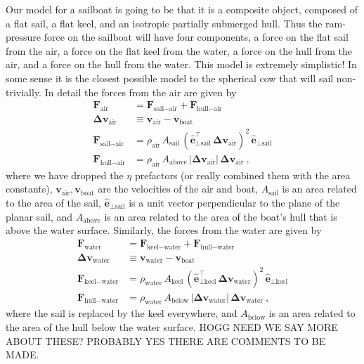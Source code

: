 \documentclass[letterpaper]{article}
\renewcommand{\vec}[1]{\boldsymbol{#1}}
\newcommand{\uvec}{\vec{\hat{e}}}
\newcommand{\air}{\text{air}}
\newcommand{\water}{\text{water}}
\newcommand{\boat}{\text{boat}}
\newcommand{\sail}{\text{sail}}
\newcommand{\keel}{\text{keel}}
\newcommand{\hull}{\text{hull}}
\renewcommand{\above}{\text{above}}
\newcommand{\below}{\text{below}}
\newcommand{\vair}{\vec{v}_\air}
\newcommand{\vwater}{\vec{v}_\water}
\newcommand{\vboat}{\vec{v}_\boat}
\begin{document}
Our model for a sailboat is going to be that it is a composite object, composed of a flat sail, a flat keel, and an isotropic partially submerged hull.
Thus the ram-pressure force on the sailboat will have four components, a force on the flat sail from the air, a force on the flat keel from the water, a force on the hull from the air, and a force on the hull from the water.
This model is extremely simplistic!
In some sense it is the closest possible model to the spherical cow that will sail non-trivially.
In detail the forces from the air are given by
\begin{align}\label{eq:startmodel}
  \vec{F}_\air &= \vec{F}_{\sail-\air} + \vec{F}_{\hull-\air}
  \\
  \vec{\Delta v}_\air &\equiv \vair - \vboat \label{eq:deltav}
  \\
  \vec{F}_{\sail-\air} & = \rho_\air\,A_\sail\,(\uvec_{\perp\sail}^\top\,\vec{\Delta v}_\air)^2\,\uvec_{\perp\sail} \label{eq:Fsailair}
  \\
  \vec{F}_{\hull-\air} & = \rho_\air\,A_{\above}\,|\vec{\Delta v}_\air|\,\vec{\Delta v}_\air ~,
\end{align}
where we have dropped the $\eta$ prefactors (or really combined them with the area constants), $\vair,\vboat$ are the velocities of the air and boat, $A_\sail$ is an area related to the area of the sail, $\uvec_{\perp\sail}$ is a unit vector perpendicular to the plane of the planar sail, and $A_{\above}$ is an area related to the area of the boat's hull that is above the water surface.
Similarly, the forces from the water are given by
\begin{align}
  \vec{F}_\water &= \vec{F}_{\keel-\water} + \vec{F}_{\hull-\water}
  \\
  \vec{\Delta v}_\water &\equiv \vwater - \vboat
  \\
  \vec{F}_{\keel-\water} & = \rho_\water\,A_\keel\,(\uvec_{\perp\keel}^\top\,\vec{\Delta v}_\water)^2\,\uvec_{\perp\keel}
  \\
  \vec{F}_{\hull-\water} & = \rho_\water\,A_{\below}\,|\vec{\Delta v}_\water|\,\vec{\Delta v}_\water ~,\label{eq:endmodel}
\end{align}
where the sail is replaced by the keel everywhere, and $A_{\below}$ is an area related to the area of the hull below the water surface.
HOGG NEED WE SAY MORE ABOUT THESE? PROBABLY YES THERE ARE COMMENTS TO BE MADE.
\end{document}

